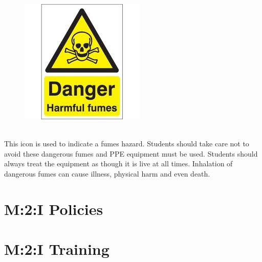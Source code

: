 \documentclass[nohyper,nobib]{tufte-book}
\begin{document}
\begin{framed}
\begin{figure}
\includegraphics[width=\linewidth]{images/fumes_hazard.jpg}
\end{figure}
\ \\
This icon is used to indicate a fumes hazard.  Students should take care not to avoid these dangerous fumes and PPE equipment must be used.  Students should always treat the equipment as though it is live at all times.  Inhalation of dangerous fumes can cause illness, physical harm and even death.
\end{framed}

\part{M:2:I Policies}




\part{M:2:I Training}











\backmatter

% 
% 


\printindex
\end{document}

